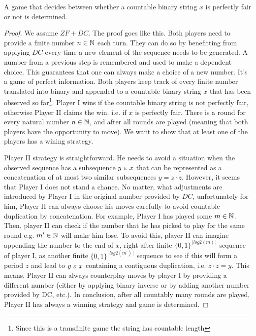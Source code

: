 \begin{theorem}\label{theorem_perfect_determinacy}
  A game that decides between whether a countable binary string $x$ is perfectly fair or not is determined. 
\end{theorem}
\begin{proof}
  We assume $ZF+DC$. The proof goes like this. Both players need to provide a finite number $n \in \mathbb{N}$ each turn. They can do so by benefitting from applying $DC$ every time a new element of the sequence needs to be generated. A number from a previous step is remembered and used to make a dependent choice. This guarantees that one can always make a choice of a new number. It's a game of perfect information. Both players keep track of every finite number translated into binary and appended to a countable binary string $x$ that has been observed so far\footnote{Since this is a transfinite game the string has countable length}. Player I wins if the countable binary string is not perfectly fair, otherwise Player II claims the win. i.e. if $x$ is perfectly fair. There is a round for every natural number $n \in \mathbb{N}$, and after all rounds are played (meaning that both players have the opportunity to move). We want to show that at least one of the players has a wining strategy. 
  
  Player II strategy is straightforward. He needs to avoid a situation when the observed sequence has a subsequence $y \ \varepsilon\  x$ that can be represented as a concatenation of at most two similar subsequences $y = z \cdot z$. However, it seems that Player I does not stand a chance. No matter, what adjustments are introduced by Player I in the original number provided by $DC$, unfortunately for him, Player II can always choose his moves carefully to avoid countable duplication by concatenation. For example, Player I has played some $m \in \mathbb{N}$. Then, player II can check if the number that he has picked to play for the same round e.g. $m^\prime \in \mathbb{N}$  will make him lose. To avoid this, player II can imagine appending the number to the end of $x$, right after finite $\{0,1\}^{\lceil log2(m) \rceil}$ sequence of player I, as another finite $\{0,1\}^{\lceil log2(m^\prime) \rceil}$ sequence to see if this will form a period $z$ and lead to $y \ \varepsilon\  x$ containing a contiguous duplication, i.e. $z \cdot z = y$. This means, Player II can always counterplay moves by player I by providing a different number (either by applying binary inverse or by adding another number provided by DC, etc.). In conclusion, after all countably many rounds are played, Player II has always a winning strategy and game is determined.
\end{proof}

